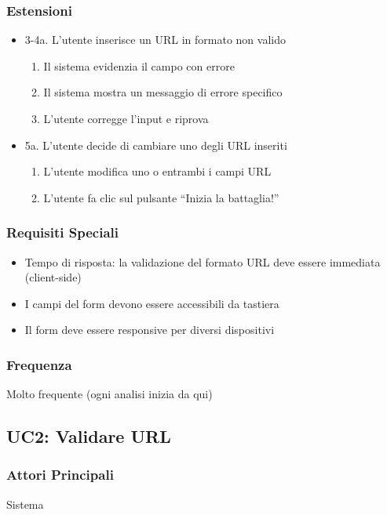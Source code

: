 \subsubsection{Estensioni}
\begin{itemize}
    \item 3-4a. L'utente inserisce un URL in formato non valido
    \begin{enumerate}
        \item Il sistema evidenzia il campo con errore
        \item Il sistema mostra un messaggio di errore specifico
        \item L'utente corregge l'input e riprova
    \end{enumerate}
    
    \item 5a. L'utente decide di cambiare uno degli URL inseriti
    \begin{enumerate}
        \item L'utente modifica uno o entrambi i campi URL
        \item L'utente fa clic sul pulsante ``Inizia la battaglia!''
    \end{enumerate}
\end{itemize}

\subsubsection{Requisiti Speciali}
\begin{itemize}
    \item Tempo di risposta: la validazione del formato URL deve essere immediata (client-side)
    \item I campi del form devono essere accessibili da tastiera
    \item Il form deve essere responsive per diversi dispositivi
\end{itemize}

\subsubsection{Frequenza}
Molto frequente (ogni analisi inizia da qui)

\subsection{UC2: Validare URL}

\subsubsection{Attori Principali}
Sistema

